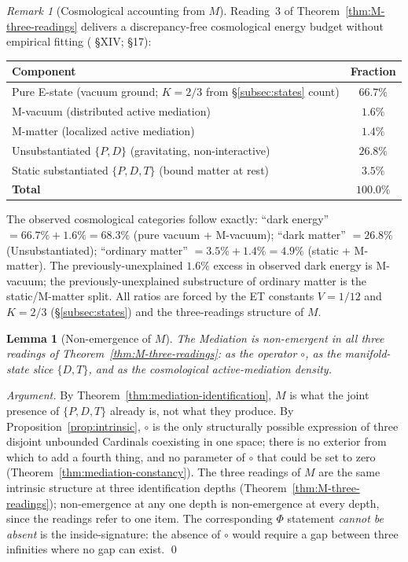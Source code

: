 \documentclass[11pt,a4paper]{article}
\newtheorem{lemma}[theorem]{Lemma}
\theoremstyle{definition}
\theoremstyle{remark}
\newtheorem{remark}[theorem]{Remark}
\begin{document}
\begin{remark}[Cosmological accounting from $M$]\label{rem:cosmological-accounting}
Reading~3 of Theorem~\ref{thm:M-three-readings} delivers a discrepancy-free cosmological energy budget without empirical fitting (\cite{Muller-IntroductoryPaper} \S XIV; \cite{Muller-IncoherencePaper} \S 17):
\begin{center}
\begin{tabular}{@{}l c@{}}
\toprule
Component & Fraction\\
\midrule
Pure E-state (vacuum ground; $K = 2/3$ from \S\ref{subsec:states} count) & $66.7\%$\\
M-vacuum (distributed active mediation) & $1.6\%$\\
M-matter (localized active mediation) & $1.4\%$\\
Unsubstantiated $\{P,D\}$ (gravitating, non-interactive) & $26.8\%$\\
Static substantiated $\{P,D,T\}$ (bound matter at rest) & $3.5\%$\\
\midrule
\textbf{Total} & $\mathbf{100.0\%}$\\
\bottomrule
\end{tabular}
\end{center}
The observed cosmological categories follow exactly: ``dark energy'' $= 66.7\% + 1.6\% = 68.3\%$ (pure vacuum + M-vacuum); ``dark matter'' $= 26.8\%$ (Unsubstantiated); ``ordinary matter'' $= 3.5\% + 1.4\% = 4.9\%$ (static + M-matter). The previously-unexplained $1.6\%$ excess in observed dark energy is M-vacuum; the previously-unexplained substructure of ordinary matter is the static/M-matter split. All ratios are forced by the ET constants $V = 1/12$ and $K = 2/3$ (\S\ref{subsec:states}) and the three-readings structure of $M$.
\end{remark}

\begin{lemma}[Non-emergence of $M$]\label{lem:emergent-M}
The Mediation is non-emergent in all three readings of Theorem~\ref{thm:M-three-readings}: as the operator $\circ$, as the manifold-state slice $\{D,T\}$, and as the cosmological active-mediation density.
\end{lemma}

\begin{proof}[Argument]
By Theorem~\ref{thm:mediation-identification}, $M$ is what the joint presence of $\{P,D,T\}$ already is, not what they produce. By Proposition~\ref{prop:intrinsic}, $\circ$ is the only structurally possible expression of three disjoint unbounded Cardinals coexisting in one space; there is no exterior from which to add a fourth thing, and no parameter of $\circ$ that could be set to zero (Theorem~\ref{thm:mediation-constancy}). The three readings of $M$ are the same intrinsic structure at three identification depths (Theorem~\ref{thm:M-three-readings}); non-emergence at any one depth is non-emergence at every depth, since the readings refer to one item. The corresponding $\Phi$ statement \emph{cannot be absent} is the inside-signature: the absence of $\circ$ would require a gap between three infinities where no gap can exist. \qed
\end{proof}
\end{document}

